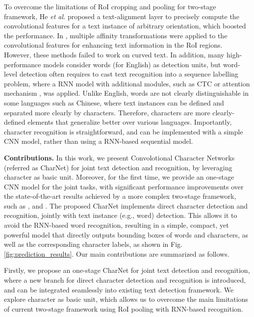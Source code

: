 \documentclass[10pt,twocolumn,letterpaper]{article}
\begin{document}
To overcome the limitations of RoI cropping and pooling for two-stage framework, He \emph{et al.} \cite{he2018end} proposed a text-alignment layer to precisely compute the convolutional
features for a text instance of arbitrary orientation, which boosted the performance. In \cite{liu2018fots}, multiple affinity transformations were applied to the convolutional features for enhancing text information in the RoI regions. However, these methods failed to work on curved text.
In addition, many high-performance models consider words (for English) as detection units,
but word-level detection often requires to cast text recognition into a sequence labelling
 problem, where a RNN model with additional modules, such as CTC \cite{graves2006connectionist,he2016aaai,shi2017pami} or attention mechanism \cite{shi2018aster, cheng2017iccv,bai2018cvpr,he2018end}, was applied. Unlike English, words are not clearly distinguishable in some languages such as Chinese, where text instances can be defined and separated more clearly by characters.
Therefore, characters are more clearly-defined elements that generalize better over various languages. Importantly, character recognition is straightforward, and can be implemented with a simple CNN model, rather than using a RNN-based sequential model.


\textbf{Contributions.} In this work, we present Convolotional Character Networks (referred as CharNet) for joint text detection and recognition, by leveraging character as basic unit. Moreover, for the first time, we provide an one-stage CNN model for the joint tasks, with significant performance improvements over the state-of-the-art results achieved by a more complex two-stage framework, such as \cite{he2018end}, \cite{lyu2018mask} and \cite{liu2018fots}. The proposed CharNet implements direct character detection and recognition, jointly with text instance (e.g., word) detection. This allows it to avoid the RNN-based word recognition, resulting in a simple, compact, yet powerful model that directly outputs bounding boxes of words and characters, as well as the corresponding character labels, as shown in Fig.\ref{fig:prediction_results}. Our main contributions are summarized as follows.

Firstly, we propose an one-stage CharNet for joint text detection and recognition, where a new branch for direct character detection and recognition is introduced, and can be integrated seamlessly into existing text detection framework. We explore character as basic unit, which allows us to overcome the main limitations of current two-stage framework using RoI pooling with RNN-based recognition.
\end{document}
